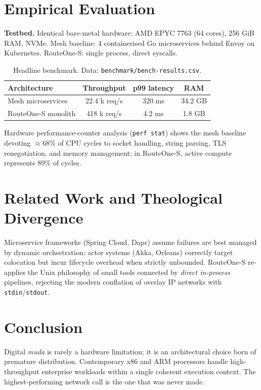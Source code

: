 \documentclass[10pt,conference]{IEEEtran}
\begin{document}
\section{Empirical Evaluation}
\textbf{Testbed.} Identical bare-metal hardware: AMD EPYC 7763 (64 cores),
256 GiB RAM, NVMe. Mesh baseline: 4 containerised Go microservices behind Envoy
on Kubernetes. RouteOne-S: single process, direct syscalls.

\begin{table}[t]
\centering
\begin{tabular}{@{}lccc@{}}
\toprule
\textbf{Architecture} & \textbf{Throughput} & \textbf{p99 latency} & \textbf{RAM} \\
\midrule
Mesh microservices & 22.4 k req/s & 320 ms & 34.2 GB \\
RouteOne-S monolith & 418 k req/s & 4.2 ms & 1.8 GB \\
\bottomrule
\end{tabular}
\caption{Headline benchmark. Data: \texttt{benchmark/bench-results.csv}.}
\label{tab:bench}
\end{table}

Hardware performance-counter analysis (\texttt{perf stat}) shows the mesh
baseline devoting $\approx$68\% of CPU cycles to socket handling, string
parsing, TLS renegotiation, and memory management; in RouteOne-S, active
compute represents 89\% of cycles.

\section{Related Work and Theological Divergence}
Microservice frameworks (Spring Cloud, Dapr) assume failures are best managed
by dynamic orchestration; actor systems (Akka, Orleans) correctly target
colocation but incur lifecycle overhead when strictly unbounded. RouteOne-S
re-applies the Unix philosophy of small tools connected by \emph{direct
in-process} pipelines, rejecting the modern conflation of overlay IP networks
with \texttt{stdin}/\texttt{stdout}.

\section{Conclusion}
Digital \emph{muda} is rarely a hardware limitation; it is an architectural
choice born of premature distribution. Contemporary x86 and ARM processors
handle high-throughput enterprise workloads within a single coherent execution
context. The highest-performing network call is the one that was never made.

\end{document}
